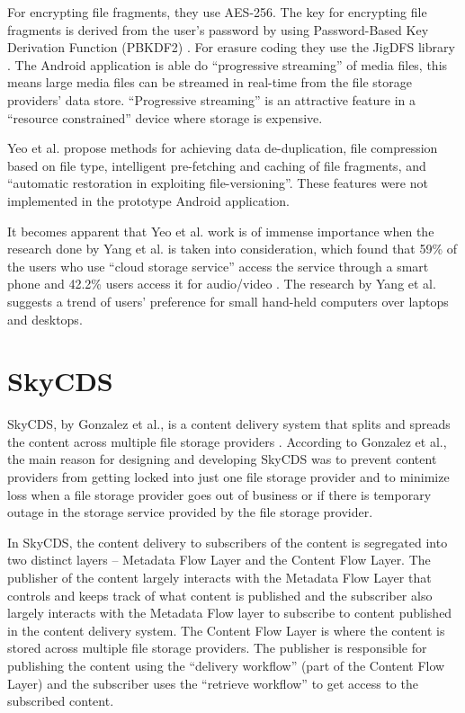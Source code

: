 For encrypting file fragments, they use AES-256. The key for
encrypting file fragments is derived from the user's password by using
Password-Based Key Derivation Function (PBKDF2) \cite{kaliski}. For
erasure coding they use the JigDFS library \cite{jigdfs}. The Android
application is able do ``progressive streaming'' of media files, this
means large media files can be streamed in real-time from the file
storage providers' data store. ``Progressive streaming'' is an
attractive feature in a ``resource constrained'' device where storage
is expensive.

Yeo et al. propose methods for achieving data de-duplication, file
compression based on file type, intelligent pre-fetching and caching
of file fragments, and ``automatic restoration in exploiting
file-versioning''. These features were not implemented in the
prototype Android application.

It becomes apparent that Yeo et al. work is of immense importance when
the research done by Yang et al. is taken into consideration, which
found that 59\% of the users who use ``cloud storage service'' access
the service through a smart phone and 42.2\% users access it for
audio/video \cite{yang}. The research by Yang et al. suggests a trend
of users' preference for small hand-held computers over laptops and
desktops.

\section{SkyCDS}\label{2-skycds-sec}

SkyCDS, by Gonzalez et al., is a content delivery system that splits
and spreads the content across multiple file storage providers
\cite{skycds}. According to Gonzalez et al., the main reason for
designing and developing SkyCDS was to prevent content providers from
getting locked into just one file storage provider and to minimize
loss when a file storage provider goes out of business or if there is
temporary outage in the storage service provided by the file storage
provider.

In SkyCDS, the content delivery to subscribers of the content is
segregated into two distinct layers -- Metadata Flow Layer and the
Content Flow Layer. The publisher of the content largely interacts
with the Metadata Flow Layer that controls and keeps track of what
content is published and the subscriber also largely interacts with
the Metadata Flow layer to subscribe to content published in the
content delivery system. The Content Flow Layer is where the content
is stored across multiple file storage providers. The publisher is
responsible for publishing the content using the ``delivery workflow''
(part of the Content Flow Layer) and the subscriber uses the
``retrieve workflow'' to get access to the subscribed content.

